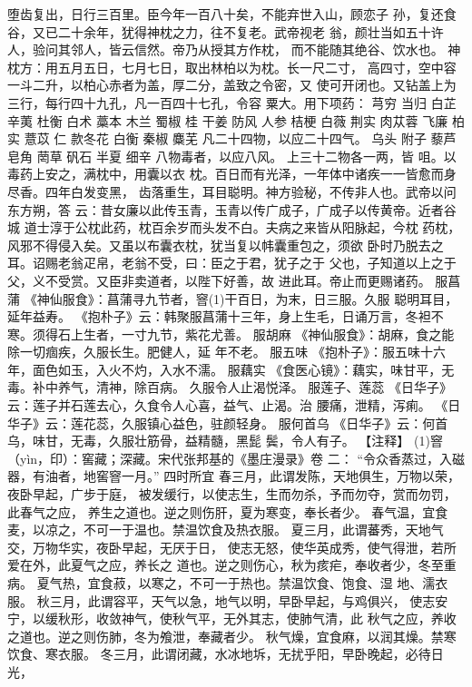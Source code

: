 \documentclass[12pt,UTF8]{ctexbook}
\begin{document}
堕齿复出，日行三百里。臣今年一百八十矣，不能弃世入山，顾恋子
孙，复还食谷，又已二十余年，犹得神枕之力，往不复老。武帝视老
翁，颜壮当如五十许人，验问其邻人，皆云信然。帝乃从授其方作枕，
而不能随其绝谷、饮水也。
神枕方：用五月五日，七月七日，取出林柏以为枕。长一尺二寸，
高四寸，空中容一斗二升，以柏心赤者为盖，厚二分，盖致之令密，又
使可开闭也。又钻盖上为三行，每行四十九孔，凡一百四十七孔，令容
粟大。用下项药：
芎穷 当归 白芷 辛荑 杜衡 白术 藁本 木兰 蜀椒 桂
干姜 防风 人参 桔梗 白薇 荆实 肉苁蓉 飞廉 柏实 薏苡
仁 款冬花 白衡 秦椒 麋芜
凡二十四物，以应二十四气。
乌头 附子 藜芦 皂角 菵草 矾石 半夏 细辛
八物毒者，以应八风。
上三十二物各一两，皆 咀。以毒药上安之，满枕中，用囊以衣
枕。百日而有光泽，一年体中诸疾一一皆愈而身尽香。四年白发变黑，
齿落重生，耳目聪明。神方验秘，不传非人也。武帝以问东方朔，答
云：昔女廉以此传玉青，玉青以传广成子，广成子以传黄帝。近者谷城
道士淳于公枕此药，枕百余岁而头发不白。夫病之来皆从阳脉起，今枕
药枕，风邪不得侵入矣。又虽以布囊衣枕，犹当复以帏囊重包之，须欲
卧时乃脱去之耳。诏赐老翁疋帛，老翁不受，曰：臣之于君，犹子之于
父也，子知道以上之于父，义不受赏。又臣非卖道者，以陛下好善，故
进此耳。帝止而更赐诸药。
服菖蒲
《神仙服食》：菖蒲寻九节者，窨(1)干百日，为末，日三服。久服
聪明耳目，延年益寿。
《抱朴子》云：韩聚服菖蒲十三年，身上生毛，日诵万言，冬袒不
寒。须得石上生者，一寸九节，紫花尤善。
服胡麻
《神仙服食》：胡麻，食之能除一切痼疾，久服长生。肥健人，延
年不老。
服五味
《抱朴子》：服五味十六年，面色如玉，入火不灼，入水不濡。
服藕实
《食医心镜》：藕实，味甘平，无毒。补中养气，清神，除百病。
久服令人止渴悦泽。
服莲子、莲蕊
《日华子》云：莲子并石莲去心，久食令人心喜，益气、止渴。治
腰痛，泄精，泻痢。
《日华子》云：莲花蕊，久服镇心益色，驻颜轻身。
服何首乌
《日华子》云：何首乌，味甘，无毒，久服壮筋骨，益精髓，黑髭
鬓，令人有子。
【注释】
(1)窨（yìn，印）：窖藏；深藏。宋代张邦基的《墨庄漫录》卷
二：
“令众香蒸过，入磁器，有油者，地窖窨一月。”
四时所宜
春三月，此谓发陈，天地俱生，万物以荣，夜卧早起，广步于庭，
被发缓行，以使志生，生而勿杀，予而勿夺，赏而勿罚，此春气之应，
养生之道也。逆之则伤肝，夏为寒变，奉长者少。
春气温，宜食麦，以凉之，不可一于温也。禁温饮食及热衣服。
夏三月，此谓蕃秀，天地气交，万物华实，夜卧早起，无厌于日，
使志无怒，使华英成秀，使气得泄，若所爱在外，此夏气之应，养长之
道也。逆之则伤心，秋为痎疟，奉收者少，冬至重病。
夏气热，宜食菽，以寒之，不可一于热也。禁温饮食、饱食、湿
地、濡衣服。
秋三月，此谓容平，天气以急，地气以明，早卧早起，与鸡俱兴，
使志安宁，以缓秋形，收敛神气，使秋气平，无外其志，使肺气清，此
秋气之应，养收之道也。逆之则伤肺，冬为飧泄，奉藏者少。
秋气燥，宜食麻，以润其燥。禁寒饮食、寒衣服。
冬三月，此谓闭藏，水冰地坼，无扰乎阳，早卧晚起，必待日光，
\end{document}
